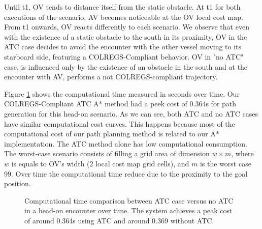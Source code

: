         Until t1, \ac{OV} tends to distance itself from the static obstacle. At t1 for both executions of the scenario, \ac{AV} becomes noticeable at the \ac{OV} local cost map. From t1 onwards, \ac{OV} reacts differently to each scenario. We observe that even with the existence of a static obstacle to the south in its proximity, \ac{OV} in the \ac{ATC} case decides to avoid the encounter with the other vessel moving to its starboard side, featuring a \ac{COLREGS}-Compliant behavior. \ac{OV} in "no ATC" case, is influenced only by the existence of an obstacle in the south and at the encounter with \ac{AV}, performs a not \ac{COLREGS}-compliant trajectory.
        
        Figure \ref{fig:plot_ho_w_vs_wo_CT} shows the computational time measured in seconds over time. Our \ac{COLREGS}-Compliant \ac{ATC} A* method had a peek cost of 0.364s for path generation for this head-on scenario. As we can see, both \ac{ATC} and no \ac{ATC} cases have similar computational cost curves. This happens because most of the computational cost of our path planning method is related to our A* implementation. The \ac{ATC} method alone has low computational consumption. The worst-case scenario consists of filling a grid area of dimension $w \times m$, where $w$ is equals to \ac{OV}'s width (2 local cost map grid cells), and $m$ is the worst case 99. Over time the computational time reduce due to the proximity to the goal position.
        
        
        \begin{figure}[H]
            \centering
            
            \caption{Computational time comparison between \ac{ATC} case versus no \ac{ATC} in a head-on encounter over time. The system achieves a peak cost of around 0.364s using \ac{ATC} and around 0.369 without \ac{ATC}.}
            \label{fig:plot_ho_w_vs_wo_CT}
        \end{figure}
        

